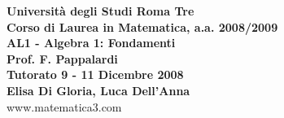 \documentclass[italian,a4paper,11pt]
{article}
\begin{document}
\begin{center}


\textbf{Universit\`a degli Studi Roma Tre}\\

\textbf{Corso di Laurea in Matematica, a.a. 2008/2009}\\

\textbf{AL1 - Algebra 1: Fondamenti}\\

\textbf{Prof. F. Pappalardi}\\

\textbf{Tutorato 9 - 11 Dicembre 2008}\\

\textbf{Elisa Di Gloria, Luca Dell'Anna}\\

www.matematica3.com\\
\end{center}



\vspace{0.5cm}
\end{document}
